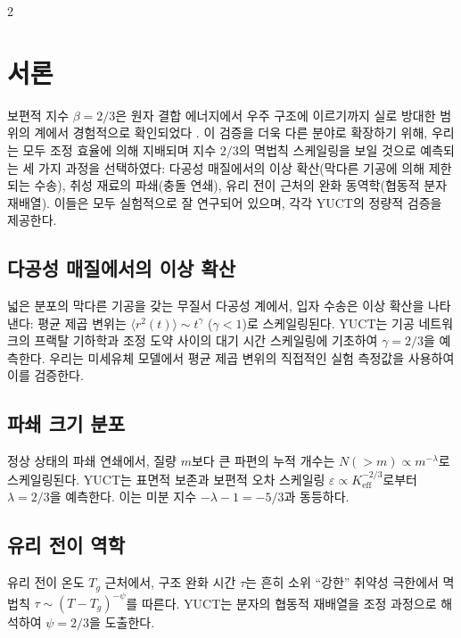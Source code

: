 \documentclass[11pt,a4paper]{article}
\newcommand{\eps}{\varepsilon}
\newcommand{\Keff}{K_{\mathrm{eff}}}
\newcommand{\betaf}{\beta}
\begin{document}
	\vspace{0.4cm}
	\vspace*{-\baselineskip}
	\begin{multicols}{2}
		
		\section{서론}
		
		보편적 지수 \(\betaf = 2/3\)은 원자 결합 에너지에서 우주 구조에 이르기까지 실로 방대한 범위의 계에서 경험적으로 확인되었다 \cite{AppendixY, AppendixL, AppendixC, AppendixG}. 이 검증을 더욱 다른 분야로 확장하기 위해, 우리는 모두 조정 효율에 의해 지배되며 지수 \(2/3\)의 멱법칙 스케일링을 보일 것으로 예측되는 세 가지 과정을 선택하였다: 다공성 매질에서의 이상 확산(막다른 기공에 의해 제한되는 수송), 취성 재료의 파쇄(충돌 연쇄), 유리 전이 근처의 완화 동역학(협동적 분자 재배열). 이들은 모두 실험적으로 잘 연구되어 있으며, 각각 YUCT의 정량적 검증을 제공한다.
		
		\subsection{다공성 매질에서의 이상 확산}
		넓은 분포의 막다른 기공을 갖는 무질서 다공성 계에서, 입자 수송은 이상 확산을 나타낸다: 평균 제곱 변위는 \(\langle r^2(t) \rangle \sim t^{\gamma}\) (\(\gamma < 1\))로 스케일링된다. YUCT는 기공 네트워크의 프랙탈 기하학과 조정 도약 사이의 대기 시간 스케일링에 기초하여 \(\gamma = 2/3\)을 예측한다. 우리는 미세유체 모델에서 평균 제곱 변위의 직접적인 실험 측정값을 사용하여 이를 검증한다.
		
		\subsection{파쇄 크기 분포}
		정상 상태의 파쇄 연쇄에서, 질량 \(m\)보다 큰 파편의 누적 개수는 \(N(>m) \propto m^{-\lambda}\)로 스케일링된다. YUCT는 표면적 보존과 보편적 오차 스케일링 \(\eps \propto \Keff^{-2/3}\)로부터 \(\lambda = 2/3\)을 예측한다. 이는 미분 지수 \(-\lambda - 1 = -5/3\)과 동등하다.
		
		\subsection{유리 전이 역학}
		유리 전이 온도 \(T_g\) 근처에서, 구조 완화 시간 \(\tau\)는 흔히 소위 “강한” 취약성 극한에서 멱법칙 \(\tau \sim (T - T_g)^{-\psi}\)를 따른다. YUCT는 분자의 협동적 재배열을 조정 과정으로 해석하여 \(\psi = 2/3\)을 도출한다.
		

\end{multicols}
\end{document}
